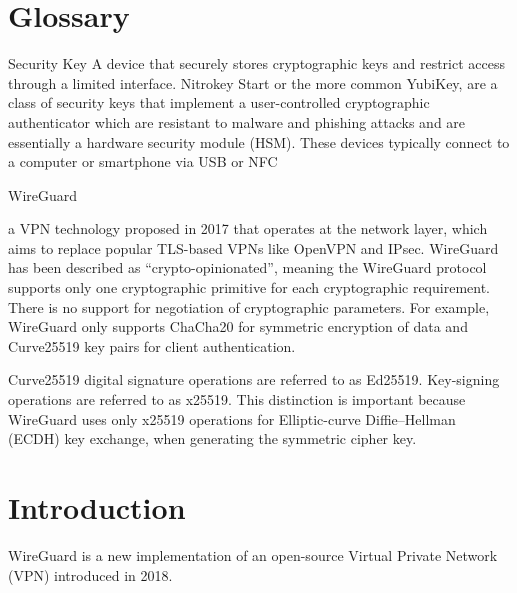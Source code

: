 \documentclass [11pt, proquest] {uwthesis}[2020/02/24]
\begin{document}
%
%
\tableofcontents
\listoffigures

\chapter*{Glossary}      %
\thispagestyle{plain}

\begin{glossary}

\item[Security Key]
A device that securely stores cryptographic keys and restrict access through a limited interface. 
Nitrokey Start\cite{noauthor_nitrokey_nodate} or the more common YubiKey\cite{noauthor_discover_nodate}\cite{noauthor_u2f_nodate-1}, are a class of security keys that implement a user-controlled 
cryptographic authenticator which are resistant to malware and phishing attacks and are essentially a hardware security module (HSM). 
These devices typically connect to a computer or smartphone via USB or NFC

\item[WireGuard]

a VPN technology proposed in 2017 that operates at the network layer, which aims to replace popular TLS-based VPNs like OpenVPN and IPsec.
WireGuard has been described as “crypto-opinionated”, meaning the WireGuard protocol supports only one cryptographic primitive for each cryptographic requirement.
There is no support for negotiation of cryptographic parameters. For example, WireGuard only supports ChaCha20 for symmetric 
encryption\cite{donenfeld_wireguard_2017} of data and Curve25519 key pairs for client authentication.

\item[Curve25519]
digital signature operations are referred to as Ed25519. Key-signing operations are referred to as x25519. 
This distinction is important because WireGuard uses only x25519 operations for Elliptic-curve Diffie–Hellman (ECDH) key exchange, 
when generating the symmetric cipher key.


\end{glossary}

\textpages

\chapter {Introduction}
WireGuard is a new implementation of an open-source Virtual Private Network (VPN) introduced in 2018.
\end{document}
